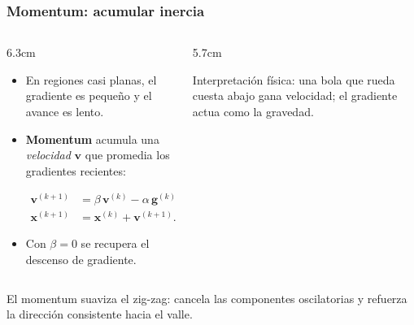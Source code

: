 \documentclass[aspectratio=169, 10pt]{beamer}
\newcommand{\gv}{\bm{g}}
\newcommand{\xv}{\bm{x}}
\newcommand{\vv}{\bm{v}}
\newcommand{\formula}[1]{%
	\begin{tcolorbox}[colback=UCMBlue!8, colframe=UCMBlue, arc=4pt,
		boxsep=2pt, left=6pt, right=6pt, top=3pt, bottom=3pt]
		#1
	\end{tcolorbox}
}
\begin{document}
\begin{frame}
\frametitle{Momentum: acumular inercia}
\begin{columns}[T]
\begin{column}{6.3cm}
\begin{itemize}
	\item En regiones casi planas, el gradiente es peque\~no y el avance es lento.
	\item \textbf{Momentum} acumula una \emph{velocidad} $\vv$ que promedia los gradientes recientes:
	\formula{\[
	\begin{aligned}
	\vv^{(k+1)} &= \beta\,\vv^{(k)} - \alpha\,\gv^{(k)},\\
	\xv^{(k+1)} &= \xv^{(k)} + \vv^{(k+1)}.
	\end{aligned}
	\]}
	\item Con $\beta=0$ se recupera el descenso de gradiente.
\end{itemize}
\end{column}
\begin{column}{5.7cm}
\begin{center}
\end{center}
\footnotesize Interpretaci\'on f\'isica: una bola que rueda cuesta abajo gana velocidad; el gradiente actua como la gravedad.
\end{column}
\end{columns}
\pause
\vspace{0.2em}
\begin{block}{}
El momentum suaviza el zig-zag: cancela las componentes oscilatorias y refuerza la direcci\'on consistente hacia el valle.
\end{block}
\end{frame}
\end{document}
